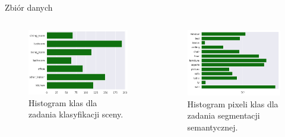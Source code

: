 \documentclass[10pt]{beamer}
\begin{document}
\begin{frame}{Zbiór danych}
    \begin{columns}
        \begin{column}{0.5\textwidth}
            \begin{figure}
                \includegraphics[width=\textwidth]{images/scene.png}
                \caption[]{Histogram klas dla zadania klasyfikacji sceny.}
            \end{figure}
            
        \end{column}

        \begin{column}{0.5\textwidth}
            
            \begin{figure}
                \includegraphics[width=\textwidth]{images/eda-seg13.png}
                \caption[]{Histogram pixeli klas dla zadania segmentacji semantycznej.}
            \end{figure}
        \end{column}
    \end{columns}
\end{frame}
\end{document}
